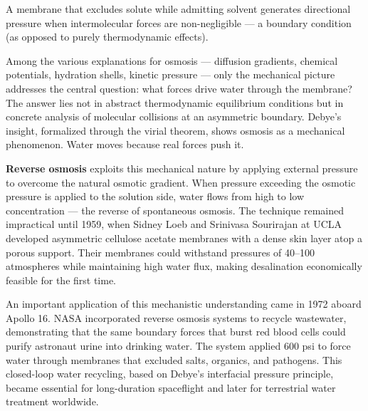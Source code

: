 A membrane that excludes solute while admitting solvent generates directional pressure when intermolecular forces are non-negligible — a boundary condition (as opposed to purely thermodynamic effects).

Among the various explanations for osmosis — diffusion gradients, chemical potentials, hydration shells, kinetic pressure — only the mechanical picture addresses the central question: what forces drive water through the membrane? The answer lies not in abstract thermodynamic equilibrium conditions but in concrete analysis of molecular collisions at an asymmetric boundary. Debye's insight, formalized through the virial theorem, shows osmosis as a mechanical phenomenon. Water moves because real forces push it.

\textbf{Reverse osmosis} exploits this mechanical nature by applying external pressure to overcome the natural osmotic gradient. When pressure exceeding the osmotic pressure is applied to the solution side, water flows from high to low concentration — the reverse of spontaneous osmosis. The technique remained impractical until 1959, when Sidney Loeb and Srinivasa Sourirajan at UCLA developed asymmetric cellulose acetate membranes with a dense skin layer atop a porous support. Their membranes could withstand pressures of 40–100 atmospheres while maintaining high water flux, making desalination economically feasible for the first time.

An important application of this mechanistic understanding came in 1972 aboard Apollo 16. NASA incorporated reverse osmosis systems to recycle wastewater, demonstrating that the same boundary forces that burst red blood cells could purify astronaut urine into drinking water. The system applied 600 psi to force water through membranes that excluded salts, organics, and pathogens. This closed-loop water recycling, based on Debye's interfacial pressure principle, became essential for long-duration spaceflight and later for terrestrial water treatment worldwide.
